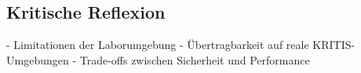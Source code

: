 \subsection{Kritische Reflexion} \label{sec:Kritische Reflexion}

- Limitationen der Laborumgebung
- Übertragbarkeit auf reale KRITIS-Umgebungen
- Trade-offs zwischen Sicherheit und Performance